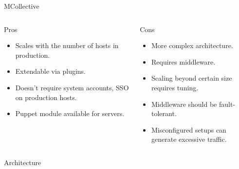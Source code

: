 \documentclass[presentation,c]{beamer}
\begin{document}
{
\begin{frame}[label=sec-15-4]{MCollective}

\begin{columns}
\begin{column}{0.5\textwidth}
\begin{block}{Pros}

\begin{itemize}
\item Scales with the number of hosts in production.
\item Extendable via plugins.
\item Doesn't require system accounts, SSO on production hosts.
\item Puppet module available for servers.
\end{itemize}
\end{block}
\end{column}

\begin{column}{0.5\textwidth}
\begin{block}{Cons}

\begin{itemize}
\item More complex architecture.
\item Requires middleware.
\item Scaling beyond certain size requires tuning.
\item Middleware should be fault-tolerant.
\item Misconfigured setups can generate excessive traffic.
\end{itemize}
\end{block}
\end{column}
\end{columns}
\end{frame}
} %

{
\begin{frame}[label=sec-15-5]{Architecture}

\end{frame}
} %
\end{document}
